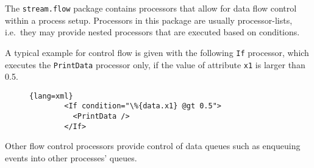 The \texttt{stream.flow} package contains processors that allow for data
flow control within a process setup. Processors in this package are
usually processor-lists, i.e.~they may provide nested processors that
are executed based on conditions.

A typical example for control flow is given with the following
\texttt{If} processor, which executes the \texttt{PrintData} processor
only, if the value of attribute \texttt{x1} is larger than 0.5.
\begin{figure}[h!]
  \begin{lstlisting}{lang=xml}
        <If condition="\%{data.x1} @gt 0.5">
          <PrintData />
        </If>
  \end{lstlisting}
\end{figure}
Other flow control processors provide control of data queues such as
enqueuing events into other processes' queues.


%
%






